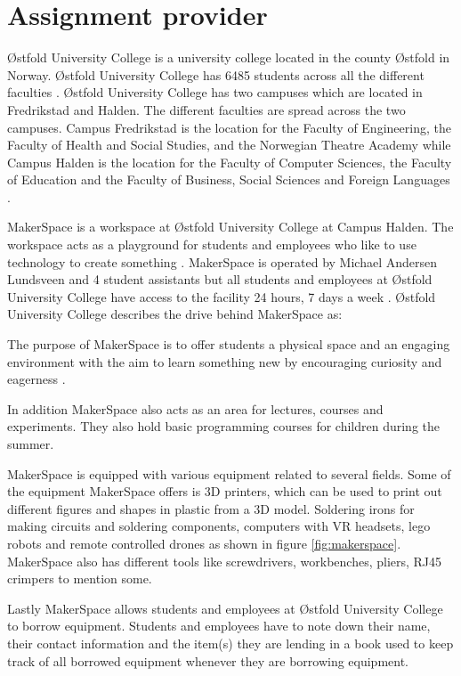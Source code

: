 \section{Assignment provider}
Østfold University College is a university college located in the county Østfold in Norway. Østfold University College has 6485 students across all the different faculties \cite{total_stundets_at_Hiof}. Østfold University College has two campuses which are located in Fredrikstad and Halden. The different faculties are spread across the two campuses. Campus Fredrikstad is the location for the Faculty of Engineering, the Faculty of Health and Social Studies, and the Norwegian Theatre Academy while Campus Halden is the location for the Faculty of Computer Sciences, the Faculty of Education and the Faculty of Business, Social Sciences and Foreign Languages \cite{Hiof_fakta}. 

MakerSpace is a workspace at Østfold University College at Campus Halden. 
The workspace acts as a playground for students and employees who like to use technology to create something \cite{what-is-makerspace}.
MakerSpace is operated by Michael Andersen Lundsveen and 4 student assistants but all students and employees at Østfold University College have access to the facility 24 hours, 7 days a week
\cite{what-is-makerspace}.
Østfold University College describes the drive behind MakerSpace as:

\begin{displayquote}
The purpose of MakerSpace is to offer students a physical space and an engaging environment with the aim to learn something new by encouraging curiosity and eagerness \cite{what-is-makerspace}.
\end{displayquote}
In addition MakerSpace also acts as an area for lectures, courses and experiments.
They also hold basic programming courses for children during the summer.

MakerSpace is equipped with various equipment related to several fields.
Some of the equipment MakerSpace offers is 3D printers, which can be used to print out different figures and shapes in plastic from a 3D model. Soldering irons for making circuits and soldering components, computers with VR headsets, lego robots and remote controlled drones as shown in figure \ref{fig:makerspace}. MakerSpace also has different tools like screwdrivers, workbenches, pliers, RJ45 crimpers to mention some.

Lastly MakerSpace allows students and employees at Østfold University College to borrow equipment.
Students and employees have to note down their name, their contact information and the item(s) they are lending in a book used to keep track of all borrowed equipment whenever they are borrowing equipment.

